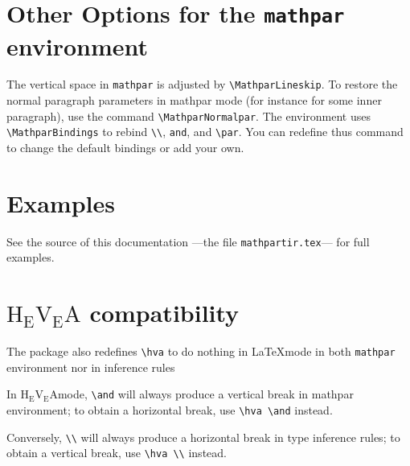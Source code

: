 \documentclass {article}
\def \L#1{\lower 0.4ex \hbox {#1}}
\def \R#1{\raise 0.4ex \hbox {#1}}
\def \hevea {H\L{E}\R{V}\L{E}A}
\def \hevea {$\mbox {H}\!_{\mbox {E}}\!\mbox {V}\!_{\mbox {E}}\!\mbox {A}$}
\let \lst \verb
\begin{document}
\section {Other Options for the {\tt mathpar} environment}

The vertical space in \verb"mathpar" is adjusted by
\verb"\MathparLineskip". To restore the normal paragraph parameters in mathpar
mode (for instance for some inner paragraph), use the command
\verb"\MathparNormalpar".
The environment uses \verb"\MathparBindings" to
rebind \verb"\\", \verb"and", and \verb"\par". You can redefine thus command
to change the default bindings or add your own.


\section {Examples}

See the source of this documentation ---the file \lst"mathpartir.tex"---
for full examples.

\section {{\hevea} compatibility}

The package also redefines \verb"\hva" to do nothing in \LaTeX mode in
both \lst"mathpar" environment nor in inference rules

In \hevea mode, \verb"\and" will always produce a vertical break in mathpar
environment; to obtain a horizontal break, use \verb"\hva \and" instead.

Conversely, \verb"\\" will always produce a horizontal break in type
inference rules; to obtain a vertical break, use \verb"\hva \\" instead.
\end{document}
